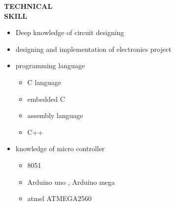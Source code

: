 \documentclass{article}
\begin{document}
   \begin{flushleft}
  \vspace{0.4in}
  \textbf{TECHNICAL  \\ SKILL}
  \begin{itemize}
  	\vspace{-0.45in}
  	\addtolength{\itemindent}{1.359in}
  	\item  Deep knowledge of circuit designing
  	\item  designing and implementation of electronics project
  	\item  programming language
  	{\begin{itemize}
  			\addtolength{\itemindent}{1.359in}
  			\item C language
  			\item embedded C
  			\item assembly language
  			\item C++
  			
  		\end{itemize}
  	}  
  	\item knowledge of micro controller
  	{\begin{itemize}
  			\addtolength{\itemindent}{1.359in}
  			\item 8051 
  			\item Arduino uno , Arduino mega
  			\item atmel ATMEGA2560
  			
  		\end{itemize}
  	}  
  	
  \end{itemize}
  \end{flushleft}

  	
 
\end{document}
